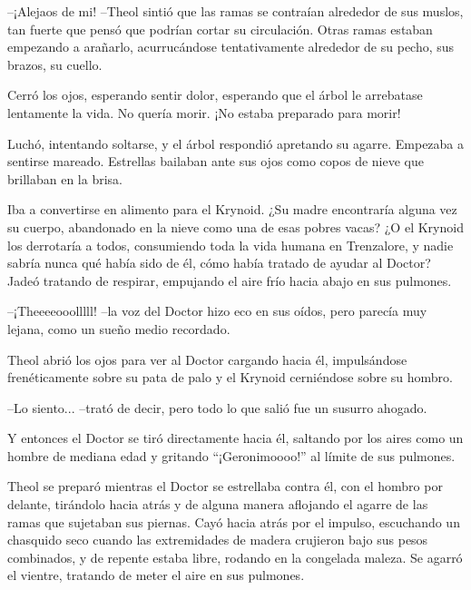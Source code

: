 --¡Alejaos de mi! --Theol sintió que las ramas se contraían alrededor de sus muslos, tan fuerte que pensó que podrían cortar su circulación. Otras ramas estaban empezando a arañarlo, acurrucándose tentativamente alrededor de su pecho, sus brazos, su cuello.



Cerró los ojos, esperando sentir dolor, esperando que el árbol le arrebatase lentamente la vida. No quería morir. ¡No estaba preparado para morir!



Luchó, intentando soltarse, y el árbol respondió apretando su agarre. Empezaba a sentirse mareado. Estrellas bailaban ante sus ojos como copos de nieve que brillaban en la brisa.



Iba a convertirse en alimento para el Krynoid. ¿Su madre encontraría alguna vez su cuerpo, abandonado en la nieve como una de esas pobres vacas? ¿O el Krynoid los derrotaría a todos, consumiendo toda la vida humana en Trenzalore, y nadie sabría nunca qué había sido de él, cómo había tratado de ayudar al Doctor? Jadeó tratando de respirar, empujando el aire frío hacia abajo en sus pulmones.



--¡Theeeeooolllll! --la voz del Doctor hizo eco en sus oídos, pero parecía muy lejana, como un sueño medio recordado.



Theol abrió los ojos para ver al Doctor cargando hacia él, impulsándose frenéticamente sobre su pata de palo y el Krynoid cerniéndose sobre su hombro.



--Lo siento... --trató de decir, pero todo lo que salió fue un susurro ahogado.



Y entonces el Doctor se tiró directamente hacia él, saltando por los aires como un hombre de mediana edad y gritando ``¡Geronimoooo!'' al límite de sus pulmones.



Theol se preparó mientras el Doctor se estrellaba contra él, con el hombro por delante, tirándolo hacia atrás y de alguna manera aflojando el agarre de las ramas que sujetaban sus piernas. Cayó hacia atrás por el impulso, escuchando un chasquido seco cuando las extremidades de madera crujieron bajo sus pesos combinados, y de repente estaba libre, rodando en la congelada maleza. Se agarró el vientre, tratando de meter el aire en sus pulmones.



